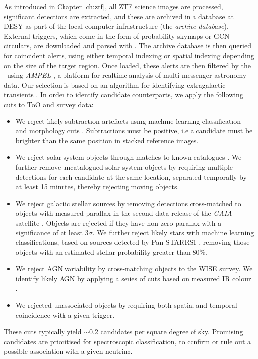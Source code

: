 As introduced in Chapter \ref{ch:ztf}, all ZTF science images are processed, significant detections are extracted, and these are archived in a database at DESY as part of the local computer infrastructure (the \emph{archive database}). External triggers, which come in the form of probability skymaps or GCN circulars, are downloaded and parsed with \ztf. The archive database is then queried for coincident alerts, using either temporal indexing or spatial indexing depending on the size of the target region. Once loaded, these alerts are then filtered by the \ztf~using \emph{AMPEL} , a platform for realtime analysis of multi-messenger astronomy data. Our selection is based on an algorithm for identifying extragalactic transients \cite{ampel}. In order to identify candidate counterparts, we apply the following cuts to ToO and survey data:

\begin{itemize}
	\item We reject likely subtraction artefacts using machine learning classification and morphology cuts . Subtractions must be positive, i.e a candidate must be brighter than the same position in stacked reference images.
	\item We reject solar system objects through matches to known catalogues \cite{ztf_ml_19}. We further remove uncatalogued solar system objects by requiring multiple detections for each candidate at the same location, separated temporally by at least 15 minutes, thereby rejecting moving objects.
	\item We reject galactic stellar sources by removing detections cross-matched to objects with measured parallax in the second data release of the \emph{GAIA} satellite . Objects are rejected if they have non-zero parallax with a significance of at least 3$\sigma$. We further reject likely stars with machine learning classifications, based on sources detected by Pan-STARRS1 , removing those objects with an estimated stellar probability greater than 80\%. 
	\item We reject AGN variability by cross-matching objects to the WISE survey. We identify likely AGN by applying a series of cuts based on measured IR colour .
	\item We rejected unassociated objects by requiring both spatial and temporal coincidence with a given trigger.
\end{itemize}

These cuts typically yield $\sim$0.2 candidates per square degree of sky. Promising candidates are prioritised for spectroscopic classification, to confirm or rule out a possible association with a given neutrino. 

